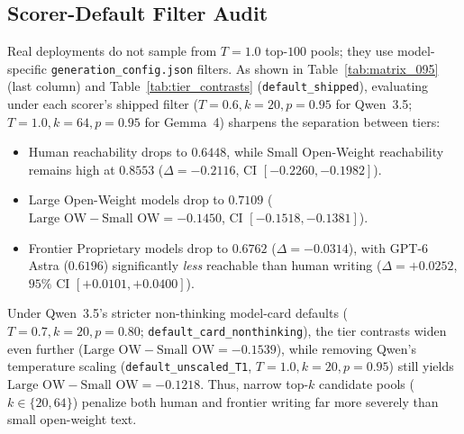 \documentclass[11pt,a4paper,twocolumn]{article}
\begin{document}
\subsection{Scorer-Default Filter Audit}
Real deployments do not sample from $T=1.0$ top-$100$ pools; they use model-specific \texttt{generation\_config.json} filters. As shown in Table~\ref{tab:matrix_095} (last column) and Table~\ref{tab:tier_contrasts} (\texttt{default\_shipped}), evaluating under each scorer's shipped filter ($T=0.6, k=20, p=0.95$ for Qwen~3.5; $T=1.0, k=64, p=0.95$ for Gemma~4) sharpens the separation between tiers:
\begin{itemize}
    \item Human reachability drops to $0.6448$, while Small Open-Weight reachability remains high at $0.8553$ ($\Delta = -0.2116$, CI $[-0.2260, -0.1982]$).
    \item Large Open-Weight models drop to $0.7109$ ($\text{Large OW} - \text{Small OW} = -0.1450$, CI $[-0.1518, -0.1381]$).
    \item Frontier Proprietary models drop to $0.6762$ ($\Delta = -0.0314$), with GPT-6 Astra ($0.6196$) significantly \emph{less} reachable than human writing ($\Delta = +0.0252$, $95\%$ CI $[+0.0101, +0.0400]$).
\end{itemize}
Under Qwen~3.5's stricter non-thinking model-card defaults ($T=0.7, k=20, p=0.80$; \texttt{default\_card\_nonthinking}), the tier contrasts widen even further ($\text{Large OW} - \text{Small OW} = -0.1539$), while removing Qwen's temperature scaling (\texttt{default\_unscaled\_T1}, $T=1.0, k=20, p=0.95$) still yields $\text{Large OW} - \text{Small OW} = -0.1218$. Thus, narrow top-$k$ candidate pools ($k \in \{20, 64\}$) penalize both human and frontier writing far more severely than small open-weight text.
\end{document}
